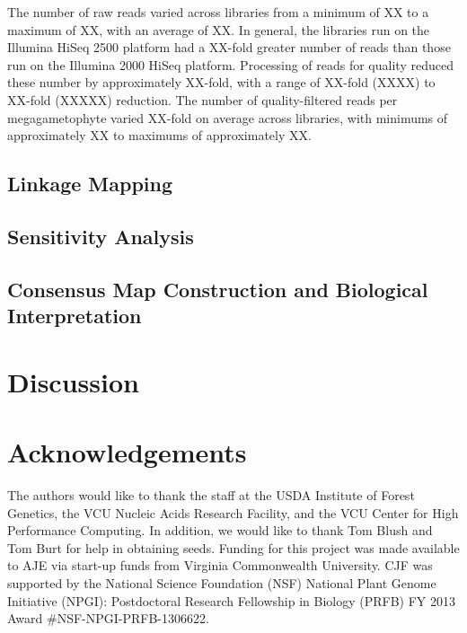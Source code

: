 \documentclass[11pt]{article}
\begin{document}
The number of raw reads varied across libraries from a minimum of XX to a maximum of XX, with an average of XX. In 
general, the libraries run on the Illumina HiSeq 2500 platform had a XX-fold greater number of reads than those run on the 
Illumina 2000 HiSeq platform. Processing of reads for quality reduced these number by approximately XX-fold, with a range 
of XX-fold (XXXX) to XX-fold (XXXXX) reduction. The number of quality-filtered reads per megagametophyte varied XX-fold on average 
across libraries, with minimums of approximately XX to maximums of approximately XX. 

\subsection*{Linkage Mapping}

\subsection*{Sensitivity Analysis}

\subsection*{Consensus Map Construction and Biological Interpretation}


\section*{Discussion}

\section*{Acknowledgements}

The authors would like to thank the staff at the USDA Institute of Forest Genetics, the 
VCU Nucleic Acids Research Facility, and the VCU Center for High Performance Computing. 
In addition, we would like to thank Tom Blush and Tom Burt for help in obtaining 
seeds. Funding for this project was made available to AJE via start-up funds from Virginia 
Commonwealth University. CJF was supported by the National Science Foundation (NSF) National Plant Genome 
Initiative (NPGI): Postdoctoral Research Fellowship in Biology (PRFB) FY 2013 Award \#NSF-NPGI-PRFB-1306622.

\clearpage

\singlespacing



\clearpage
\end{document}
